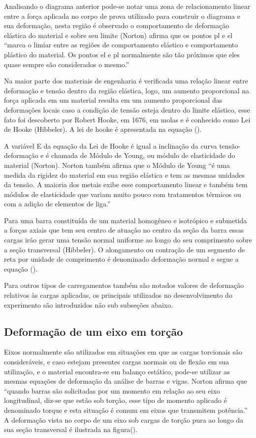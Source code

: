 Analisando o diagrama anterior pode-se notar uma zona de relacionamento linear entre a força aplicada no corpo de prova utilizado para construir o diagrama e sua deformação, nesta região é observado o comportamento de deformação elástica do material e sobre seu limite (Norton) afirma que os pontos pl e el “marca o limiar entre as regiões de comportamento elástico e comportamento plástico do material. Os pontos el e pl normalmente são tão próximos que eles quase sempre são considerados o mesmo.”

Na maior parte dos materiais de engenharia é verificada uma relação linear entre deformação e tensão dentro da região elástica, logo, um aumento proporcional na força aplicada em um material resulta em um aumento proporcional das deformações locais caso a condição de tensão esteja dentro do limite elástico, esse fato foi descoberto por Robert Hooke, em 1676, em molas e é conhecido como Lei de Hooke (Hibbeler). A lei de hooke é apresentada na equação ().

A variável E da equação da Lei de Hooke é igual a inclinação da curva tensão-deformação e é chamada de Módulo de Young, ou módulo de elasticidade do material (Norton). Norton também afirma que o Módulo de Young “é uma medida da rigidez do material em sua região elástica e tem as mesmas unidades da tensão. A maioria dos metais exibe esse comportamento linear e também tem módulos de elasticidade que variam muito pouco com tratamentos térmicos ou com a adição de elementos de liga.”

Para uma barra constituída de um material homogêneo e isotrópico e submetida a forças axiais que tem seu centro de atuação no centro da seção da barra essas cargas irão gerar uma tensão normal uniforme ao longo do seu comprimento sobre a seção transversal (Hibbeler). O alongamento ou contração de um segmento de reta por unidade de comprimento é denominado deformação normal e segue a equação ().

Para outros tipos de carregamentos também são notados valores de deformação relativos às cargas aplicadas, os principais utilizados no desenvolvimento do experimento são introduzidos não sub subseções abaixo.

\subsection{Deformação de um eixo em torção}

Eixos normalmente são utilizados em situações em que as cargas torcionais são consideráveis, e caso estejam presentes cargas normais ou de flexão em sua utilização, e o material encontra-se em balanço estático, pode-se utilizar as mesmas equações de deformação da análise de barras e vigas. Norton afirma que “quando barras são solicitadas por um momento em relação ao seu eixo longitudinal, diz-se que estão sob torção, esse tipo de momento aplicado é denominado torque e esta situação é comum em eixos que transmitem potência.” A deformação vista no corpo de um eixo sob cargas de torção pura ao longo da sua seção transversal é ilustrada na figura().

